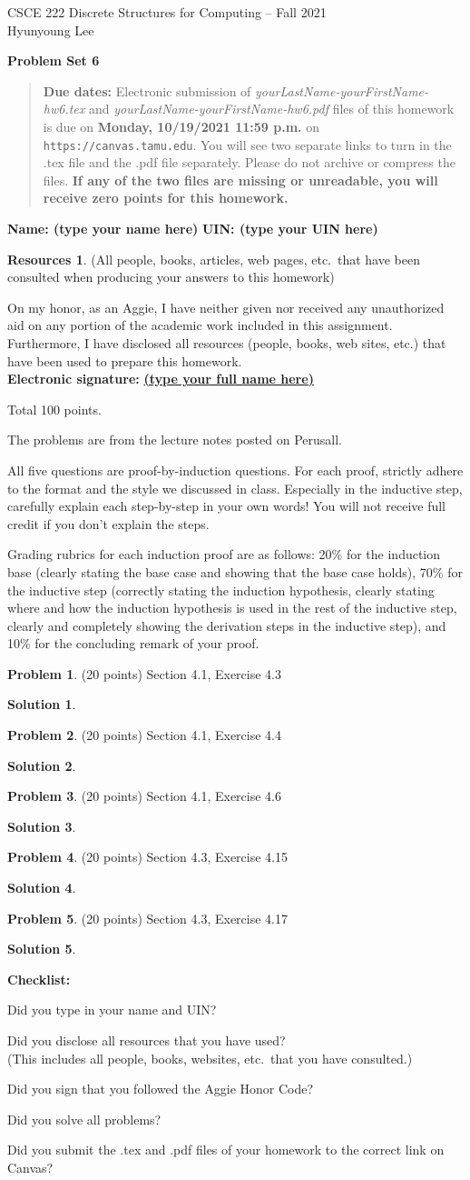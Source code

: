 \documentclass{article}
\theoremstyle{definition}
\newtheorem{problem}{Problem}
\newtheorem*{solution}{Solution}
\newtheorem*{resources}{Resources}
\newcommand{\name}[2]{\noindent\textbf{Name: #1}\hfill \textbf{UIN: #2}}
\newcommand{\honor}{\noindent On my honor, as an Aggie, I have neither
  given nor received any unauthorized aid on any portion of the
  academic work included in this assignment. Furthermore, I have
  disclosed all resources (people, books, web sites, etc.) that have
  been used to prepare this homework. \\[2ex]
 \textbf{Electronic signature:} \underline{ \textbf{(type your full name here)} } }
\newcommand{\checklist}{\noindent\textbf{Checklist:}
\begin{compactitem}[$\Box$] 
\item Did you type in your name and UIN? 
\item Did you disclose all resources that you have used? \\
(This includes all people, books, websites, etc.\ that you have consulted.)
\item Did you sign that you followed the Aggie Honor Code? 
\item Did you solve all problems? 
\item Did you submit the .tex and .pdf files of your homework to the correct link on Canvas? 
\end{compactitem}
}
\newcommand{\problemset}[1]{\begin{center}\textbf{Problem Set #1}\end{center}}
\newcommand{\duedate}[1]{\begin{quote}\textbf{Due dates:} Electronic
    submission of \textsl{yourLastName-yourFirstName-hw6.tex} and 
    \textsl{yourLastName-yourFirstName-hw6.pdf} files of this homework is due on
    \textbf{#1} on \texttt{https://canvas.tamu.edu}. You will see two separate links
    to turn in the .tex file and the .pdf file separately. Please do not archive or compress the files.  
    \textbf{If any of the two files are missing or unreadable, you will receive zero points for this
    homework.}\end{quote} }
\begin{document}
\vspace*{-20mm}
\begin{center}
{\large
CSCE 222 Discrete Structures for Computing -- Fall 2021\\[.5ex]
Hyunyoung Lee\\}
\end{center}
\problemset{6}
\duedate{Monday, 10/19/2021 11:59 p.m.}
\name{ (type your name here) }{ (type your UIN here) }
\begin{resources} (All people, books, articles, web pages, etc.\ that
  have been consulted when producing your answers to this homework)
\end{resources}
\honor

\bigskip

\noindent
Total 100 points.

\bigskip

\noindent
The problems are from the lecture notes posted on Perusall.

\medskip

\noindent
All five questions are proof-by-induction questions.  For each proof, strictly adhere 
to the format and the style we discussed in class.  Especially in the inductive step, 
carefully explain each step-by-step in your own words!  You will not receive full credit 
if you don't explain the steps.

Grading rubrics for each induction proof are as follows: 20\% for the induction base
(clearly stating the base case and showing that the base case holds), 70\% for the
inductive step (correctly stating the induction hypothesis, clearly stating where
and how the induction hypothesis is used in the rest of the inductive step, clearly
and completely showing the derivation steps in the inductive step), and 10\% for the 
concluding remark of your proof. 

\medskip

\begin{problem} (20 points) Section 4.1, Exercise 4.3
\end{problem}
\begin{solution} 
\end{solution}

\begin{problem} (20 points) Section 4.1, Exercise 4.4
\end{problem}
\begin{solution} 
\end{solution}

\begin{problem} (20 points) Section 4.1, Exercise 4.6
\end{problem}
\begin{solution} 
\end{solution}

\begin{problem} (20 points) Section 4.3, Exercise 4.15
\end{problem}
\begin{solution} 
\end{solution}

\begin{problem} (20 points) Section 4.3, Exercise 4.17
\end{problem}
\begin{solution} 
\end{solution}

\goodbreak
\checklist
\end{document}
